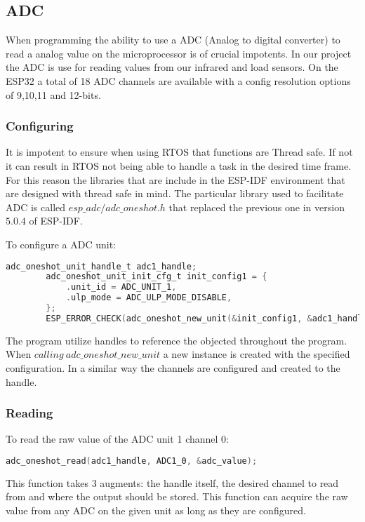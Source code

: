 \documentclass[../report.tex]{subfiles}
\begin{document}
    \subsection{ADC}
    When programming the ability to use a ADC (Analog to digital converter) to
    read a analog value on the microprocessor is of crucial impotents. In our
    project the ADC is use for reading values from our infrared and load
    sensors. On the ESP32 a total of 18 ADC channels are available with a config
    resolution options of 9,10,11 and 12-bits.
    \subsubsection{Configuring}
    It is impotent to ensure when using RTOS that functions are Thread safe. If
    not it can result in RTOS not being able to handle a task in the desired
    time frame. For this reason the libraries that are
    include in the ESP-IDF environment that are designed with thread safe in
    mind. The particular library used to facilitate ADC is called
    $esp\_adc/adc\_oneshot.h$ that replaced the previous one in version $5.0.4$ of
    ESP-IDF. 

    To configure a ADC unit:
    \begin{lstlisting}[language=c, caption={Configuring ADC unit 1}]
        adc_oneshot_unit_handle_t adc1_handle;
        adc_oneshot_unit_init_cfg_t init_config1 = {
            .unit_id = ADC_UNIT_1,
            .ulp_mode = ADC_ULP_MODE_DISABLE,
        };
        ESP_ERROR_CHECK(adc_oneshot_new_unit(&init_config1, &adc1_handle));
    \end{lstlisting}

    The program utilize handles to reference the objected throughout the
    program. When $calling\ adc\_oneshot\_new\_unit$ a new instance is created with
    the specified configuration. In a similar way the channels are configured
    and created to the handle.
    \subsubsection{Reading}
    To read the raw value of the ADC unit 1 channel 0:
    \begin{lstlisting}[language=c, caption={Readning ADC unit 1 channel 0}]
        adc_oneshot_read(adc1_handle, ADC1_0, &adc_value);
    \end{lstlisting}
    This function takes 3 augments: the handle itself, the desired channel to
    read from and where the output should be stored.
    This function can acquire the raw value from any ADC on the given unit as
    long as they are configured.
\end{document}
